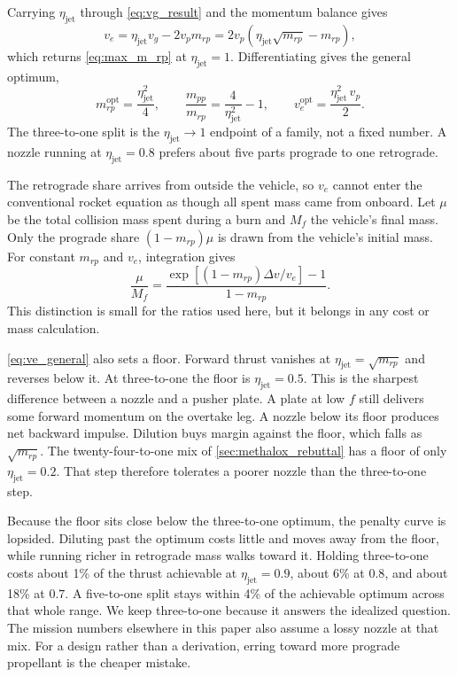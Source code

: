 \documentclass{article}
\newcommand{\deltav}{\Delta v}
\begin{document}
Carrying $\eta_{\mathrm{jet}}$ through \autoref{eq:vg_result} and the momentum balance gives
\begin{equation}
v_e = \eta_{\mathrm{jet}} v_g - 2v_pm_{rp} = 2v_p\left(\eta_{\mathrm{jet}}\sqrt{m_{rp}} - m_{rp}\right),
\label{eq:ve_general}
\end{equation}
which returns \autoref{eq:max_m_rp} at $\eta_{\mathrm{jet}} = 1$. Differentiating gives the general optimum,
\begin{equation}
m_{rp}^{\mathrm{opt}} = \frac{\eta_{\mathrm{jet}}^2}{4}, \qquad
\frac{m_{pp}}{m_{rp}} = \frac{4}{\eta_{\mathrm{jet}}^2} - 1, \qquad
v_e^{\mathrm{opt}} = \frac{\eta_{\mathrm{jet}}^2\,v_p}{2}.
\label{eq:eta_optimum}
\end{equation}
The three-to-one split is the $\eta_{\mathrm{jet}} \to 1$ endpoint of a family, not a fixed number. A nozzle running at $\eta_{\mathrm{jet}} = 0.8$ prefers about five parts prograde to one retrograde.

The retrograde share arrives from outside the vehicle, so $v_e$ cannot enter the conventional rocket equation as though all spent mass came from onboard. Let $\mu$ be the total collision mass spent during a burn and $M_f$ the vehicle's final mass. Only the prograde share $(1-m_{rp})\mu$ is drawn from the vehicle's initial mass. For constant $m_{rp}$ and $v_e$, integration gives
\begin{equation}
\frac{\mu}{M_f} = \frac{\exp\!\left[(1-m_{rp})\deltav/v_e\right]-1}{1-m_{rp}}.
\label{eq:external_reaction_mass}
\end{equation}
This distinction is small for the ratios used here, but it belongs in any cost or mass calculation.

\autoref{eq:ve_general} also sets a floor. Forward thrust vanishes at $\eta_{\mathrm{jet}} = \sqrt{m_{rp}}$ and reverses below it. At three-to-one the floor is $\eta_{\mathrm{jet}} = 0.5$. This is the sharpest difference between a nozzle and a pusher plate. A plate at low $f$ still delivers some forward momentum on the overtake leg. A nozzle below its floor produces net backward impulse. Dilution buys margin against the floor, which falls as $\sqrt{m_{rp}}$. The twenty-four-to-one mix of \autoref{sec:methalox_rebuttal} has a floor of only $\eta_{\mathrm{jet}} = 0.2$. That step therefore tolerates a poorer nozzle than the three-to-one step.

Because the floor sits close below the three-to-one optimum, the penalty curve is lopsided. Diluting past the optimum costs little and moves away from the floor, while running richer in retrograde mass walks toward it. Holding three-to-one costs about 1\% of the thrust achievable at $\eta_{\mathrm{jet}} = 0.9$, about 6\% at $0.8$, and about 18\% at $0.7$. A five-to-one split stays within 4\% of the achievable optimum across that whole range. We keep three-to-one because it answers the idealized question. The mission numbers elsewhere in this paper also assume a lossy nozzle at that mix. For a design rather than a derivation, erring toward more prograde propellant is the cheaper mistake.
\end{document}
